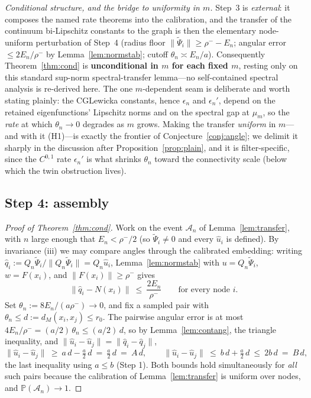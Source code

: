\documentclass[review,supplement]{siamart220329}
\begin{document}
\smallskip\noindent\emph{Conditional structure, and the bridge to uniformity in
$m$.} Step~3 is \emph{external}: it composes the named rate theorems
\cite{calder2022,calderlewicka2022} into the calibration, and the transfer of the
continuum bi-Lipschitz constants to the graph is then the elementary
node-uniform perturbation of Step~4 (radius floor $\lVert\widetilde\Psi_i\rVert\ge
\rho^--E_n$; angular error $\le2E_n/\rho^-$ by Lemma~\ref{lem:normstab}; cutoff
$\theta_n\asymp E_n/a$). Consequently Theorem~\ref{thm:cond} is
\textbf{unconditional in $m$ for each fixed $m$}, resting only on this standard
sup-norm spectral-transfer lemma---no self-contained spectral analysis is
re-derived here. The one $m$-dependent seam is deliberate and worth stating
plainly: the CGLewicka constants, hence $\epsilon_n$ and $\epsilon_n'$, depend on
the retained eigenfunctions' Lipschitz norms and on the spectral gap at $\mu_m$,
so the \emph{rate} at which $\theta_n\to0$ degrades as $m$ grows. Making the
transfer \emph{uniform} in $m$---and with it (H1)---is exactly the frontier of
Conjecture~\ref{conj:angle}; we delimit it sharply in the discussion after
Proposition~\ref{prop:plain}, and it is filter-specific, since the $C^{0,1}$ rate
$\epsilon_n'$ is what shrinks $\theta_n$ toward the connectivity scale (below
which the twin obstruction lives).

\subsection*{Step 4: assembly}
\begin{proof}[Proof of Theorem~\ref{thm:cond}]
Work on the event $\mathcal A_n$ of Lemma~\ref{lem:transfer}, with $n$ large
enough that $E_n<\rho^-/2$ (so $\widetilde\Psi_i\ne0$ and every $\hat u_i$ is
defined). By invariance (iii) we may compare angles through the calibrated
embedding: writing $\hat q_i:=Q_n\widetilde\Psi_i/\lVert Q_n\widetilde\Psi_i
\rVert=Q_n\hat u_i$, Lemma~\ref{lem:normstab} with $u=Q_n\widetilde\Psi_i$,
$w=F(x_i)$, and $\lVert F(x_i)\rVert\ge\rho^-$ gives
\[
\lVert\hat q_i-N(x_i)\rVert\ \le\ \frac{2E_n}{\rho^-}
\qquad\text{for every node }i .
\]
Set $\theta_n:=8E_n/(a\rho^-)\to0$, and fix a sampled pair with
$\theta_n\le d:=d_M(x_i,x_j)\le r_0$. The pairwise angular error is at most
$4E_n/\rho^-=(a/2)\,\theta_n\le(a/2)\,d$, so by Lemma~\ref{lem:contang}, the
triangle inequality, and
$\lVert\hat u_i-\hat u_j\rVert=\lVert\hat q_i-\hat q_j\rVert$,
\[
\lVert\hat u_i-\hat u_j\rVert\ \ge\ a\,d-\tfrac a2\,d\ =\ \tfrac a2\,d\ =\ A\,d,
\qquad
\lVert\hat u_i-\hat u_j\rVert\ \le\ b\,d+\tfrac a2\,d\ \le\ 2b\,d\ =\ B\,d,
\]
the last inequality using $a\le b$ (Step 1). Both bounds hold simultaneously
for \emph{all} such pairs because the calibration of Lemma~\ref{lem:transfer}
is uniform over nodes, and $\mathbb P(\mathcal A_n)\to1$.
\end{proof}
\end{document}
